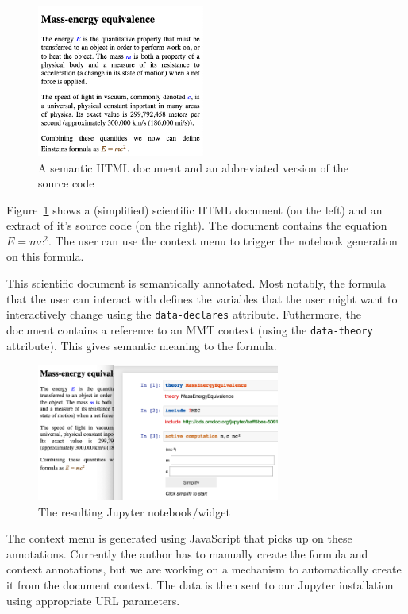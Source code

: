 \begin{figure}[h]
  \begin{minipage}[c]{5.5cm}
  \vspace{-20pt}
  \includegraphics[width=5.5cm]{screenshots/sciencedoc}
  \end{minipage}
  \begin{minipage}[c]{7cm}
    
  \end{minipage}
  \caption{A semantic HTML document and an abbreviated version of the source code}\label{fig:conversionHTML}
\end{figure}

Figure~\ref{fig:conversionHTML} shows a (simplified) scientific HTML document (on the left) and an extract of it's source code (on the right).
The document contains the equation $E=mc^2$. 
The user can use the context menu to trigger the notebook generation on this formula.

This scientific document is semantically annotated. 
Most notably, the formula that the user can interact with defines the variables that the user might want to interactively change using the \texttt{data-declares} attribute. 
Futhermore, the document contains a reference to an MMT context (using the \texttt{data-theory} attribute). 
This gives semantic meaning to the formula. 

\begin{figure}\vspace*{-2em}
  \includegraphics[width=8cm]{screenshots/emc}\vspace*{-1em}
\caption{The resulting Jupyter notebook/widget}\label{fig:conversionNotebook}\vspace*{-2em}
\end{figure}
The context menu is generated using JavaScript that picks up on these annotations.
Currently the author has to manually create the formula and context annotations, but we are working on a mechanism to automatically create it from the document context.
The data is then sent to our Jupyter installation using appropriate URL parameters. 

